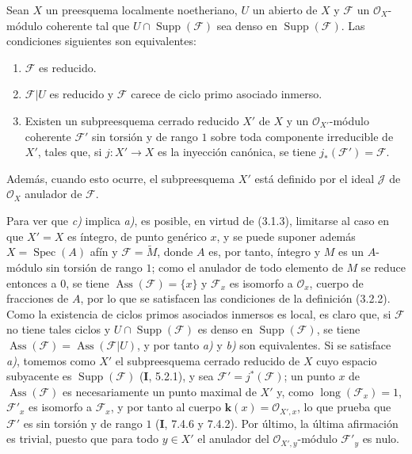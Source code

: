 \begin{proposition}[3.2.3]
\label{IV.2.3.2.3-fr}
Sean $X$ un preesquema localmente noetheriano, $U$ un abierto de $X$ y
$\mathcal F$ un $\mathcal O_X$-módulo coherente tal que
$U\cap\operatorname{Supp}(\mathcal F)$ sea denso en
$\operatorname{Supp}(\mathcal F)$. Las condiciones siguientes son
equivalentes:
\begin{enumerate}
\item[\emph{a)}] $\mathcal F$ es reducido.
\item[\emph{b)}] $\mathcal F|U$ es reducido y $\mathcal F$ carece de ciclo
primo asociado inmerso.
\item[\emph{c)}] Existen un subpreesquema cerrado reducido $X'$ de $X$ y un
$\mathcal O_{X'}$-módulo coherente $\mathcal F'$ sin torsión y de rango $1$
sobre toda componente irreducible de $X'$, tales que, si $j:X'\to X$ es la
inyección canónica, se tiene $j_*(\mathcal F')=\mathcal F$.
\end{enumerate}
Además, cuando esto ocurre, el subpreesquema $X'$ está definido por el ideal
$\mathcal J$ de $\mathcal O_X$ anulador de $\mathcal F$.
\end{proposition}

Para ver que \emph{c)} implica \emph{a)}, es posible, en virtud de (3.1.3),
limitarse al caso en que $X'=X$ es íntegro, de punto genérico $x$, y se puede
suponer además $X=\operatorname{Spec}(A)$ afín y $\mathcal F=\widetilde M$,
donde $A$ es, por tanto, íntegro y $M$ es un $A$-módulo sin torsión de rango
$1$; como el anulador de todo elemento de $M$ se reduce entonces a $0$, se
tiene $\operatorname{Ass}(\mathcal F)=\{x\}$ y $\mathcal F_x$ es isomorfo a
$\mathcal O_x$, cuerpo de fracciones de $A$, por lo que se satisfacen las
condiciones de la definición (3.2.2). Como la existencia de ciclos primos
asociados inmersos es local, es claro que, si $\mathcal F$ no tiene tales
ciclos y $U\cap\operatorname{Supp}(\mathcal F)$ es denso en
$\operatorname{Supp}(\mathcal F)$, se tiene
$\operatorname{Ass}(\mathcal F)=\operatorname{Ass}(\mathcal F|U)$, y por
tanto \emph{a)} y \emph{b)} son equivalentes. Si se satisface \emph{a)},
tomemos como $X'$ el subpreesquema cerrado reducido de $X$ cuyo espacio
subyacente es $\operatorname{Supp}(\mathcal F)$ (\textbf I, 5.2.1), y sea
$\mathcal F'=j^*(\mathcal F)$; un punto $x$ de
$\operatorname{Ass}(\mathcal F)$ es necesariamente un punto maximal de $X'$ y,
como $\operatorname{long}(\mathcal F_x)=1$, $\mathcal F'_x$ es isomorfo a
$\mathcal F_x$, y por tanto al cuerpo $\boldsymbol{k}(x)=\mathcal O_{X',x}$, lo que prueba
que $\mathcal F'$ es sin torsión y de rango $1$ (\textbf I, 7.4.6 y 7.4.2). Por
último, la última afirmación es trivial, puesto que para todo $y\in X'$ el
anulador del $\mathcal O_{X',y}$-módulo $\mathcal F'_y$ es nulo.


